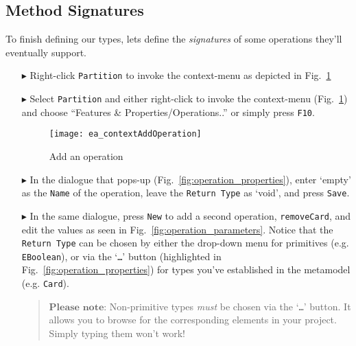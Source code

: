 \newpage
\subsection{Method Signatures}
\visHeader
\hypertarget{static:methods vis}{}

To finish defining our types, lets define the \emph{signatures} of some operations they'll eventually support.

\begin{enumerate}
  
\item[$\blacktriangleright$] Right-click \texttt{Partition} to invoke the context-menu as depicted in Fig.~\ref{fig:add_operation}

\item[$\blacktriangleright$] Select \texttt{Partition} and either right-click to invoke the context-menu (Fig.~\ref{fig:add_operation})  and choose ``Features \&
Properties/Operations..'' or simply press \texttt{F10}.

\begin{figure}[htbp]
	\centering
  \texttt{[image: ea\_contextAddOperation]}
	\caption{Add an operation}
	\label{fig:add_operation}
\end{figure}
\FloatBarrier

\item[$\blacktriangleright$] In the dialogue that pops-up (Fig.~\ref{fig:operation_properties}), enter `empty' as the \texttt{Name} of the operation,
leave the \texttt{Return Type} as `void', and press \texttt{Save}. 

\vspace{0.5cm}

\item[$\blacktriangleright$] In the same dialogue, press \texttt{New} to add a second operation, \texttt{removeCard}, and edit the values as seen in 
Fig.~\ref{fig:operation_parameters}. Notice that the \texttt{Return Type} can be chosen by either the drop-down menu for
primitives (e.g. \texttt{EBoolean}), or via the `\texttt{\ldots}' button (highlighted in Fig.~\ref{fig:operation_properties}) for types you've established in
the metamodel (e.g. \texttt{Card}).
\vspace{-.3cm}
\begin{quote}
{ \small
$\textbf{Please note:}$ Non-primitive types \emph{must} be chosen via the `\texttt{\ldots}' button. It allows you to browse for the corresponding elements in
your project. Simply typing them won't work!
}
\end{quote}


\end{enumerate}
